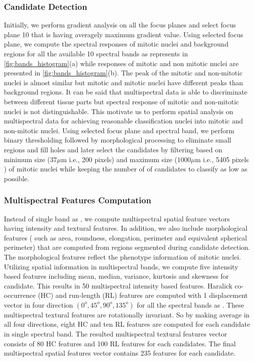 \documentclass[10pt,twocolumn,letterpaper]{article}
\begin{document}
\subsubsection{Candidate Detection}
Initially, we perform gradient analysis on all the focus planes and select focus plane 10 that is having averagely maximum gradient value. Using selected focus plane, we compute the spectral responses of mitotic nuclei and background regions for all the available 10 spectral bands as represents in \ref{fig:bands_histogram}(a) while responses of mitotic and non mitotic nuclei are presented in \ref{fig:bands_histogram}(b). The peak of the mitotic and non-mitotic nuclei is almost similar but mitotic and mitotic nuclei have different peaks than background regions. It can be said that multispectral data is able to discriminate between different tissue parts but spectral response of mitotic and non-mitotic nuclei is not distinguishable. This motivate us to perform spatial analysis on multispectral data for achieving reasonable classification nuclei into mitotic and non-mitotic nuclei. Using selected focus plane and spectral band, we perform binary thresholding followed by morphological processing to eliminate small regions and fill holes and later select the candidates by filtering based on minimum size ($37\mu\text{m}$ i.e., 200 pixels) and maximum size ($1000\mu\text{m}$ i.e., 5405 pixels ) of mitotic nuclei while keeping the number of of candidates to classify as low as possible. 

\subsubsection{Multispectral Features Computation}
Instead of single band as \cite{boucheron2007, masood2009, wu2009, wu2012}, we compute multispectral spatial feature vectors having intensity and textural features. In addition, we also include morphological features ( such as area, roundness, elongation, perimeter and equivalent spherical perimeter) that are computed from regions segmented during candidate detection. The morphological features reflect the phenotype information of mitotic nuclei. Utilizing spatial information in multispectral bands, we compute five intensity based features including mean, median, variance, kurtosis and skewness for candidate. This results in 50 multispectral intensity based features. Haralick co-occurrence (HC) \cite{haralick1973} and run-length (RL) \cite{galloway1975} features are computed with 1 displacement vector in four direction $(0^o, 45^o, 90^o, 135^o)$ for all the spectral bands as \cite{irshad2013b}. These multispectral textural features are rotationally invariant. So by making average in all four directions, eight HC and ten RL features are computed for each candidate in single spectral band. The resulted multispectral textural features vector consists of 80 HC features and 100 RL features for each candidates. The final multispectral spatial features vector contains 235 features for each candidate. 
\end{document}
